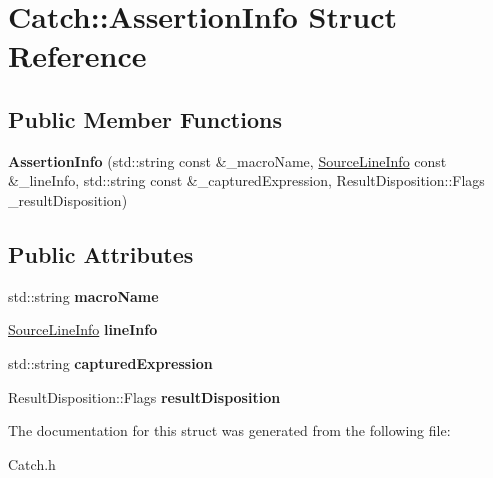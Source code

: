 \hypertarget{struct_catch_1_1_assertion_info}{\section{Catch\-:\-:Assertion\-Info Struct Reference}
\label{struct_catch_1_1_assertion_info}
}
\subsection*{Public Member Functions}
\begin{DoxyCompactItemize}
\item 
\hypertarget{struct_catch_1_1_assertion_info_aaf6cc3eebd40391e54d37ed42953c73f}{{\bfseries Assertion\-Info} (std\-::string const \&\-\_\-macro\-Name, \hyperlink{struct_catch_1_1_source_line_info}{Source\-Line\-Info} const \&\-\_\-line\-Info, std\-::string const \&\-\_\-captured\-Expression, Result\-Disposition\-::\-Flags \-\_\-result\-Disposition)}\label{struct_catch_1_1_assertion_info_aaf6cc3eebd40391e54d37ed42953c73f}

\end{DoxyCompactItemize}
\subsection*{Public Attributes}
\begin{DoxyCompactItemize}
\item 
\hypertarget{struct_catch_1_1_assertion_info_ac2e59e8c89e00eb3390768f50d540b18}{std\-::string {\bfseries macro\-Name}}\label{struct_catch_1_1_assertion_info_ac2e59e8c89e00eb3390768f50d540b18}

\item 
\hypertarget{struct_catch_1_1_assertion_info_a17bdbb404ba12658034f833be2f4c3e7}{\hyperlink{struct_catch_1_1_source_line_info}{Source\-Line\-Info} {\bfseries line\-Info}}\label{struct_catch_1_1_assertion_info_a17bdbb404ba12658034f833be2f4c3e7}

\item 
\hypertarget{struct_catch_1_1_assertion_info_af7c1d3cbfa346e9a303030fa0ef0cb54}{std\-::string {\bfseries captured\-Expression}}\label{struct_catch_1_1_assertion_info_af7c1d3cbfa346e9a303030fa0ef0cb54}

\item 
\hypertarget{struct_catch_1_1_assertion_info_a60353b3632ab2f827162f2b2d6911073}{Result\-Disposition\-::\-Flags {\bfseries result\-Disposition}}\label{struct_catch_1_1_assertion_info_a60353b3632ab2f827162f2b2d6911073}

\end{DoxyCompactItemize}


The documentation for this struct was generated from the following file\-:\begin{DoxyCompactItemize}
\item 
Catch.\-h\end{DoxyCompactItemize}
